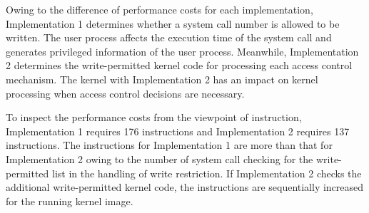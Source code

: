 %
Owing to the difference of performance costs for each implementation, Implementation 1
determines whether a system call number is allowed to be written. 
The user process affects the execution time of the system call and generates
privileged information of the user process.
%
Meanwhile, Implementation 2 determines the write-permitted kernel code for
processing each access control mechanism. 
%
The kernel with Implementation 2 has an impact on kernel processing when access
control decisions are necessary.
%
%

%  

To inspect the performance costs from the viewpoint of instruction,
Implementation 1 requires 176 instructions and Implementation 2 requires 137
instructions.
%
The instructions for Implementation 1 are more than that for Implementation 2
owing to the number of system call checking for the write-permitted list in the
handling of write restriction.
%
If Implementation 2 checks the additional write-permitted kernel code, the
instructions are sequentially increased for the running kernel image.

%


